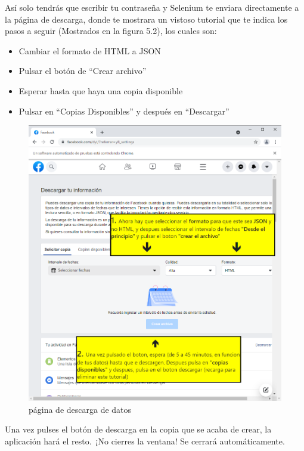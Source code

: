 Así solo tendrás que escribir tu contraseña y Selenium te enviara directamente a la página de descarga, donde te mostrara un vistoso tutorial que te indica los pasos a seguir (Mostrados en la figura 5.2), los cuales son:

\begin{itemize}
	\item Cambiar el formato de HTML a JSON
	\item Pulsar el botón de ``Crear archivo''
	\item Esperar hasta que haya una copia disponible
	\item Pulsar en ``Copias Disponibles'' y después en ``Descargar''
\end{itemize}
\begin{figure}
	\begin{center}
		\includegraphics[scale=0.5]{Imagenes/Fuentes/TutorialDescarga2.png} \caption{página de descarga de datos}
		\label{TutorialDescarga2}
	\end{center}
\end{figure}

Una vez pulses el botón de descarga en la copia que se acaba de crear, la aplicación hará el resto. ¡No cierres la ventana! Se cerrará automáticamente.

